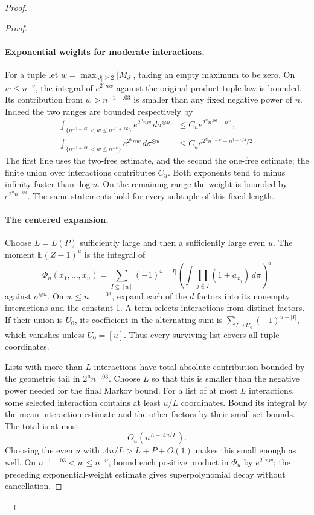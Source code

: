 \begin{proof}
\begin{proof}
\paragraph{Exponential weights for moderate interactions.}
For a tuple let \(w=\max_{|J|\ge2}|M_J|\), taking an empty maximum to be zero. On \(w\le n^{-\upsilon}\), the integral of \(e^{2^unw}\) against the original product tuple law is bounded. Its contribution from \(w>n^{-1-.03}\) is smaller than any fixed negative power of \(n\). Indeed the two ranges are bounded respectively by
\[
 \begin{aligned}
 \int_{\{n^{-1-.03}<w\le n^{-1+.06}\}}e^{2^unw}\,d\sigma^{\otimes u}
   &\le C_u e^{2^u n^{.06}-n^{.4}},\\
 \int_{\{n^{-1+.06}<w\le n^{-\upsilon}\}}e^{2^unw}\,d\sigma^{\otimes u}
   &\le C_u e^{2^u n^{1-\upsilon}-n^{1-\upsilon/4}/2}.
 \end{aligned}
\]
The first line uses the two-free estimate, and the second the one-free estimate; the finite union over interactions contributes \(C_u\). Both exponents tend to minus infinity faster than \(\log n\). On the remaining range the weight is bounded by \(e^{2^u n^{-.03}}\). The same statements hold for every subtuple of this fixed length.

\paragraph{The centered expansion.}
Choose \(L=L(P)\) sufficiently large and then a sufficiently large even \(u\). The moment \(\mathbb E(Z-1)^u\) is the integral of
\[
 \Phi_u(x_1,\ldots,x_u)
 =\sum_{I\subseteq[u]}(-1)^{u-|I|}
   \left(\int\prod_{j\in I}(1+a_{x_j})\,d\pi\right)^d
\]
against \(\sigma^{\otimes u}\). On \(w\le n^{-1-.03}\), expand each of the \(d\) factors into its nonempty interactions and the constant 1. A term selects interactions from distinct factors. If their union is \(U_0\), its coefficient in the alternating sum is
\(\sum_{I\supseteq U_0}(-1)^{u-|I|}\),
which vanishes unless \(U_0=[u]\). Thus every surviving list covers all tuple coordinates.

Lists with more than \(L\) interactions have total absolute contribution bounded by the geometric tail in \(2^u n^{-.03}\). Choose \(L\) so that this is smaller than the negative power needed for the final Markov bound. For a list of at most \(L\) interactions, some selected interaction contains at least \(u/L\) coordinates. Bound its integral by the mean-interaction estimate and the other factors by their small-set bounds. The total is at most
\[
 O_u(n^{L-.4u/L}).
\]
Choosing the even \(u\) with \(.4u/L>L+P+O(1)\) makes this small enough as well. On \(n^{-1-.03}<w\le n^{-\upsilon}\), bound each positive product in \(\Phi_u\) by \(e^{2^unw}\); the preceding exponential-weight estimate gives superpolynomial decay without cancellation.


\end{proof}
\end{proof}

